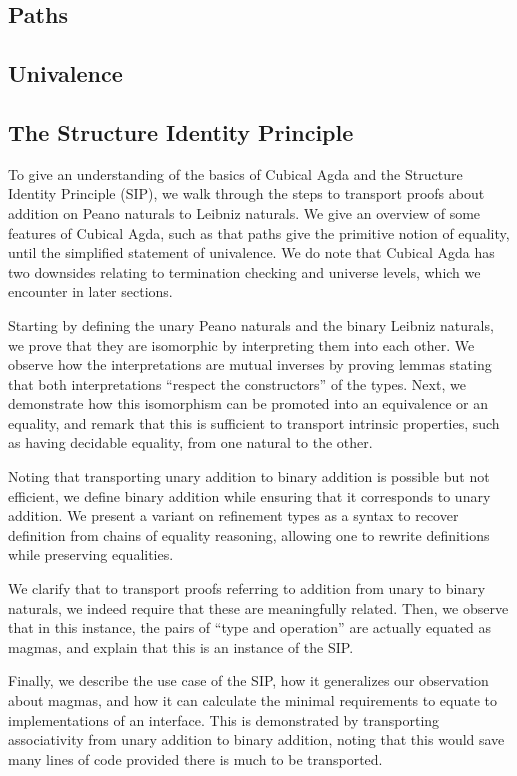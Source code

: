 \subsection{Paths}


\subsection{Univalence}


\subsection{The Structure Identity Principle}\label{ssec:leibniz}
To give an understanding of the basics of Cubical Agda \cite{cuagda} and the Structure Identity Principle (SIP), we walk through the steps to transport proofs about addition on Peano naturals to Leibniz naturals. We give an overview of some features of Cubical Agda, such as that paths give the primitive notion of equality, until the simplified statement of univalence. We do note that Cubical Agda has two downsides relating to termination checking and universe levels, which we encounter in later sections.

Starting by defining the unary Peano naturals and the binary Leibniz naturals, we prove that they are isomorphic by interpreting them into each other. We observe how the interpretations are mutual inverses by proving lemmas stating that both interpretations ``respect the constructors'' of the types. Next, we demonstrate how this isomorphism can be promoted into an equivalence or an equality, and remark that this is sufficient to transport intrinsic properties, such as having decidable equality, from one natural to the other.

Noting that transporting unary addition to binary addition is possible but not efficient, we define binary addition while ensuring that it corresponds to unary addition. We present a variant on refinement types as a syntax to recover definition from chains of equality reasoning, allowing one to rewrite definitions while preserving equalities.

We clarify that to transport proofs referring to addition from unary to binary naturals, we indeed require that these are meaningfully related. Then, we observe that in this instance, the pairs of ``type and operation'' are actually equated as magmas, and explain that this is an instance of the SIP.

Finally, we describe the use case of the SIP, how it generalizes our observation about magmas, and how it can calculate the minimal requirements to equate to implementations of an interface. This is demonstrated by transporting associativity from unary addition to binary addition, noting that this would save many lines of code provided there is much to be transported.




